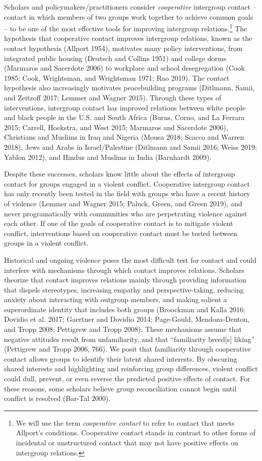 \documentclass[11pt]{article}
\begin{document}
Scholars and policymakers/practitioners consider \emph{cooperative}
intergroup contact -- contact in which members of two groups work
together to achieve common goals -- to be one of the most effective
tools for improving intergroup relations.\footnote{We will use the term
  \emph{cooperative contact} to refer to contact that meets Allport's
  conditions. Cooperative contact stands in contrast to other forms of
  incidental or unstructured contact that may not have positive effects
  on intergroup relations.} The hypothesis that cooperative contact
improves intergroup relations, known as the contact hypothesis (Allport
1954), motivates many policy interventions, from integrated public
housing (Deutsch and Collins 1951) and college dorms (Marmaros and
Sacerdote 2006) to workplace and school desegregation (Cook 1985; Cook,
Wrightsman, and Wrightsman 1971; Rao 2019). The contact hypothesis also
increasingly motivates peacebuilding programs (Ditlmann, Samii, and
Zeitzoff 2017; Lemmer and Wagner 2015). Through these types of
interventions, intergroup contact has improved relations between white
people and black people in the U.S. and South Africa (Burns, Corno, and
La Ferrara 2015; Carrell, Hoekstra, and West 2015; Marmaros and
Sacerdote 2006), Christians and Muslims in Iraq and Nigeria (Mousa 2018;
Scacco and Warren 2018), Jews and Arabs in Israel/Palestine (Ditlmann
and Samii 2016; Weiss 2019; Yablon 2012), and Hindus and Muslims in
India (Barnhardt 2009).

Despite these successes, scholars know little about the effects of
intergroup contact for groups engaged in a violent conflict. Cooperative
intergroup contact has only recently been tested in the field with
groups who have a recent history of violence (Lemmer and Wagner 2015;
Paluck, Green, and Green 2019), and never programatically with
communities who are perpetrating violence against each other. If one of
the goals of cooperative contact is to mitigate violent conflict,
interventions based on cooperative contact must be tested between groups
in a violent conflict.

Historical and ongoing violence poses the most difficult test for
contact and could interfere with mechanisms through which contact
improves relations. Scholars theorize that contact improves relations
mainly through providing information that dispels stereotypes,
increasing empathy and perspective-taking, reducing anxiety about
interacting with outgroup members, and making salient a superordinate
identity that includes both groups (Broockman and Kalla 2016; Dovidio et
al. 2017; Gaertner and Dovidio 2014; Page-Gould, Mendoza-Denton, and
Tropp 2008; Pettigrew and Tropp 2008). These mechanisms assume that
negative attitudes result from unfamiliarity, and that ``familiarity
breed{[}s{]} liking'' (Pettigrew and Tropp 2006, 766). We posit that
familiarity through cooperative contact allows groups to identify their
latent shared interests. By obscuring shared interests and highlighting
and reinforcing group differences, violent conflict could dull, prevent,
or even reverse the predicted positive effects of contact. For these
reasons, some scholars believe group reconciliation cannot begin until
conflict is resolved (Bar-Tal 2000).
\end{document}
